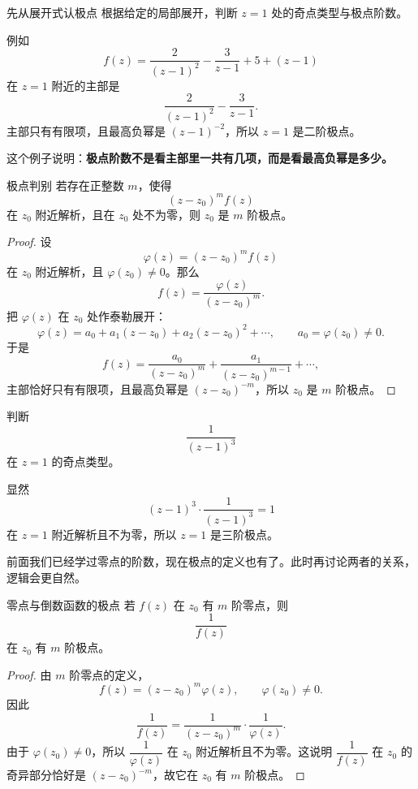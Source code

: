 \begin{lizi}{先从展开式认极点}{}
根据给定的局部展开，判断 $z=1$ 处的奇点类型与极点阶数。

\begin{jie}
例如
\[
    f(z)=\frac{2}{(z-1)^2}-\frac{3}{z-1}+5+(z-1)
\]
在 $z=1$ 附近的主部是
\[
    \frac{2}{(z-1)^2}-\frac{3}{z-1}.
\]
主部只有有限项，且最高负幂是 $(z-1)^{-2}$，所以 $z=1$ 是二阶极点。

这个例子说明：\textbf{极点阶数不是看主部里一共有几项，而是看最高负幂是多少。}
\end{jie}
\end{lizi}

\begin{dingli}{极点判别}{}
若存在正整数 $m$，使得
\[
    (z-z_0)^m f(z)
\]
在 $z_0$ 附近解析，且在 $z_0$ 处不为零，则 $z_0$ 是 $m$ 阶极点。
\end{dingli}

\begin{proof}
设
\[
    \varphi(z)=(z-z_0)^m f(z)
\]
在 $z_0$ 附近解析，且 $\varphi(z_0)\ne 0$。那么
\[
    f(z)=\frac{\varphi(z)}{(z-z_0)^m}.
\]
把 $\varphi(z)$ 在 $z_0$ 处作泰勒展开：
\[
    \varphi(z)=a_0+a_1(z-z_0)+a_2(z-z_0)^2+\cdots,
\qquad a_0=\varphi(z_0)\ne 0.
\]
于是
\[
    f(z)=\frac{a_0}{(z-z_0)^m}+\frac{a_1}{(z-z_0)^{m-1}}+\cdots,
\]
主部恰好只有有限项，且最高负幂是 $(z-z_0)^{-m}$，所以 $z_0$ 是 $m$ 阶极点。
\end{proof}

\begin{lizi}{}{}
判断
\[
    \frac{1}{(z-1)^3}
\]
在 $z=1$ 的奇点类型。

\begin{jie}
显然
\[
    (z-1)^3 \cdot \frac{1}{(z-1)^3}=1
\]
在 $z=1$ 附近解析且不为零，所以 $z=1$ 是三阶极点。
\end{jie}
\end{lizi}

\begin{tishi}[现在再回头看零点与极点的联系]
前面我们已经学过零点的阶数，现在极点的定义也有了。此时再讨论两者的关系，逻辑会更自然。
\end{tishi}

\begin{dingli}{零点与倒数函数的极点}{}
若 $f(z)$ 在 $z_0$ 有 $m$ 阶零点，则
\[
    \frac{1}{f(z)}
\]
在 $z_0$ 有 $m$ 阶极点。
\end{dingli}

\begin{proof}
由 $m$ 阶零点的定义，
\[
    f(z)=(z-z_0)^m\varphi(z),
\qquad \varphi(z_0)\ne 0.
\]
因此
\[
    \frac{1}{f(z)}
    = \frac{1}{(z-z_0)^m}\cdot\frac{1}{\varphi(z)}.
\]
由于 $\varphi(z_0)\ne 0$，所以 $\dfrac{1}{\varphi(z)}$ 在 $z_0$ 附近解析且不为零。这说明 $\dfrac{1}{f(z)}$ 在 $z_0$ 的奇异部分恰好是 $(z-z_0)^{-m}$，故它在 $z_0$ 有 $m$ 阶极点。
\end{proof}

